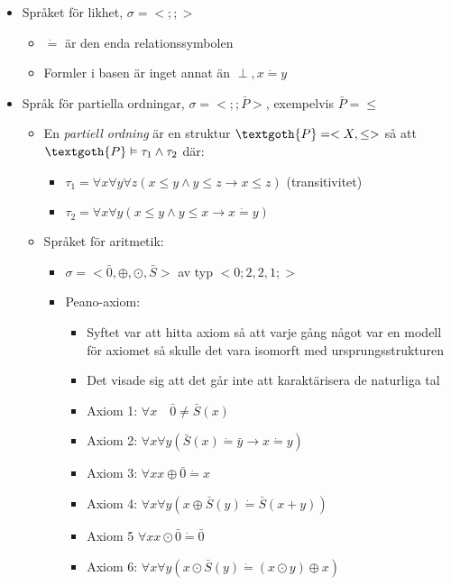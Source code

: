 \begin{itemize}
  \item Språket för likhet, $\sigma=<;;>$
    \begin{itemize}
      \item$\dot{=}$ är den enda relationssymbolen
      \item Formler i basen är inget annat än $\perp, x\dot{=}y$
    \end{itemize}
  \item Språk för partiella ordningar, $\sigma=<;;\bar{P}>$, exempelvis $\bar{P}=\leq$
    \begin{itemize}
      \item En \textit{partiell ordning} är en struktur $\textgoth{P}=<X,\leq>$ så att $\textgoth{P}\vDash\tau_1\wedge\tau_2$ där:
        \begin{itemize}
          \item $\tau_1 = \forall x \forall y \forall z\left(x\leq y\wedge y\leq z\rightarrow x\leq z\right)$ (transitivitet)
          \item $\tau_2 = \forall x \forall y\left(x\leq y\wedge y\leq x\rightarrow x\dot{=}y\right)$
        \end{itemize}
      \item Språket för aritmetik:
        \begin{itemize}
          \item $\sigma = <\bar{0},\oplus,\odot,\bar{S}>$ av typ $<0;2,2,1;>$
          \item Peano-axiom:
            \begin{itemize}
              \item Syftet var att hitta axiom så att varje gång något var en modell för axiomet så skulle det vara isomorft med ursprungsstrukturen 
              \item Det visade sig att det går inte att karaktärisera de naturliga tal
              \item Axiom 1: $\forall x\quad \bar{0}\neq\bar{S}(x)$
              \item Axiom 2: $\forall x\forall y(\bar{S}(x)\dot{=}\bar{y}\rightarrow x\dot{=}y)$
              \item Axiom 3: $\forall x x\oplus\bar{0}\dot{=}x$
              \item Axiom 4: $\forall x\forall y(x\oplus\bar{S}(y)\dot{=}\bar{S}(x+y))$
              \item Axiom 5 $\forall x x\odot\bar{0}\dot{=}\bar{0}$
              \item Axiom 6: $\forall x\forall y(x\odot\bar{S}(y)\dot{=}(x\odot y)\oplus x)$

\end{itemize}
\end{itemize}
\end{itemize}
\end{itemize}
